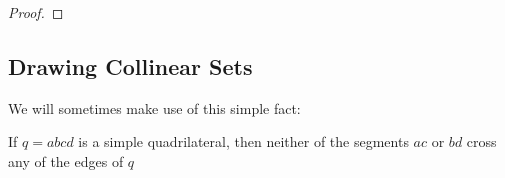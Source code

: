 \documentclass{patmorin}
\begin{document}
\begin{proof}


\end{proof}



%
%

\subsection{Drawing Collinear Sets}


We will sometimes make use of this simple fact:
\begin{obs}
  If $q=abcd$ is a simple quadrilateral, then neither of the segments $ac$
  or $bd$ cross any of the edges of $q$
\end{obs}
\end{document}
